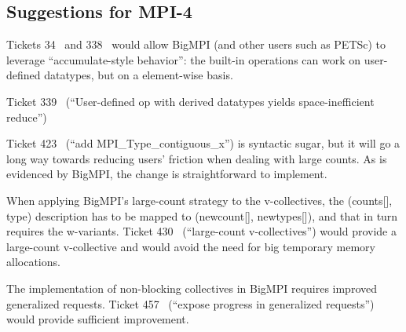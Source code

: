 
\subsection{Suggestions for MPI-4}

Tickets 34~\cite{ticket34} and 338~\cite{ticket338}
would allow BigMPI (and other users such as PETSc) to leverage ``accumulate-style
behavior'':  the built-in operations can work on user-defined
datatypes, but on a element-wise basis.

Ticket 339~\cite{ticket339} %
(``User-defined op with derived datatypes yields space-inefficient reduce'')

Ticket 423~\cite{ticket423} %
(``add MPI\_Type\_contiguous\_x'') is syntactic sugar, but it will go a long way towards reducing users' friction when dealing with large counts.  As is evidenced by BigMPI, the change is straightforward to implement.

When applying BigMPI's large-count strategy to the v-collectives, the (counts[], type) description has to be mapped to (newcount[], newtypes[]),
and that in turn requires the w-variants.
Ticket 430~\cite{ticket430}
(``large-count v-collectives'') would provide a large-count v-collective and would avoid the need for big temporary memory allocations.

The implementation of non-blocking collectives in BigMPI requires improved generalized requests.
Ticket 457~\cite{ticket457} %
(``expose progress in generalized requests'') would provide sufficient improvement.

